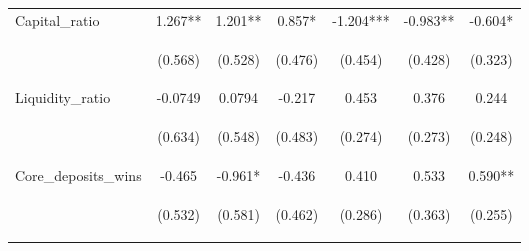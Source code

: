 \begin{tabular}{lcccccc}
Capital\_ratio & 1.267** & 1.201** & 0.857* & -1.204*** & -0.983** & -0.604* \\
\vspace{4pt} & \begin{footnotesize}(0.568)\end{footnotesize} & \begin{footnotesize}(0.528)\end{footnotesize} & \begin{footnotesize}(0.476)\end{footnotesize} & \begin{footnotesize}(0.454)\end{footnotesize} & \begin{footnotesize}(0.428)\end{footnotesize} & \begin{footnotesize}(0.323)\end{footnotesize} \\
Liquidity\_ratio & -0.0749 & 0.0794 & -0.217 & 0.453 & 0.376 & 0.244 \\
\vspace{4pt} & \begin{footnotesize}(0.634)\end{footnotesize} & \begin{footnotesize}(0.548)\end{footnotesize} & \begin{footnotesize}(0.483)\end{footnotesize} & \begin{footnotesize}(0.274)\end{footnotesize} & \begin{footnotesize}(0.273)\end{footnotesize} & \begin{footnotesize}(0.248)\end{footnotesize} \\
Core\_deposits\_wins & -0.465 & -0.961* & -0.436 & 0.410 & 0.533 & 0.590** \\
\vspace{4pt} & \begin{footnotesize}(0.532)\end{footnotesize} & \begin{footnotesize}(0.581)\end{footnotesize} & \begin{footnotesize}(0.462)\end{footnotesize} & \begin{footnotesize}(0.286)\end{footnotesize} & \begin{footnotesize}(0.363)\end{footnotesize} & \begin{footnotesize}(0.255)\end{footnotesize} \\

\end{tabular}
